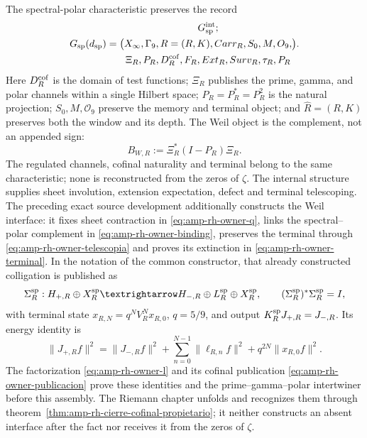 The spectral-polar characteristic preserves the record
\begin{equation}\label{eq:pdf2-g-sp-explicito}
 \mathfrak G_{\rm sp}(d_{\rm sp})=
 \bigl(
 \begin{gathered}
  \mathfrak G_{\rm sp}^{\rm int};\\
  \widehat X_\infty,\Gamma_9,\widehat R=(R,K),
  \operatorname{Carr}_R,S_0,M,\mathcal O_9,\\
  \Xi_R,P_R,\mathcal D_R^{\rm cof},
  \mathcal F_R,\operatorname{Ext}_R,\operatorname{Surv}_R,
  \tau_R,\mathcal P_R
 \end{gathered}
 \bigr).
\end{equation}
Here $\mathcal D_R^{\rm cof}$ is the domain of test functions; $\Xi_R$ publishes
the prime, gamma, and polar channels within a single Hilbert space; $P_R=P_R^*=P_R^2$ is the
natural projection; $S_0,M,\mathcal O_9$ preserve the memory and terminal object; and
$\widehat R=(R,K)$ preserves both the window and its depth. The Weil object
is the complement, not an appended sign:
\begin{equation}\label{eq:pdf2-g-sp-complemento}
 B_{W,R}:=\Xi_R^*(I-P_R)\Xi_R.
\end{equation}
The regulated channels, cofinal naturality and terminal belong to the same characteristic; none is reconstructed from the zeros of $\zeta$. The internal structure supplies sheet involution, extension expectation, defect and terminal telescoping. The preceding exact source development additionally constructs the Weil interface: it fixes sheet contraction in \eqref{eq:amp-rh-owner-q}, links the spectral--polar complement in \eqref{eq:amp-rh-owner-binding}, preserves the terminal through \eqref{eq:amp-rh-owner-telescopia} and proves its extinction in \eqref{eq:amp-rh-owner-terminal}. In the notation of the common constructor, that already constructed colligation is published as
\begin{equation}\label{eq:pdf2-g-sp-coligacion-dato}
 \Sigma_R^{\rm sp}:
 \mathcal H_{+,R}\oplus\mathcal X_R^{\rm sp}
 \longrightarrow
 \mathcal H_{-,R}\oplus\mathcal L_R^{\rm sp}
 \oplus\mathcal X_R^{\rm sp},
 \qquad
 (\Sigma_R^{\rm sp})^*\Sigma_R^{\rm sp}=I,
\end{equation}
with terminal state $x_{R,N}=q^NV_R^Nx_{R,0}$, $q=5/9$, and output
$K_R^{\rm sp}J_{+,R}=J_{-,R}$. Its energy identity is
\begin{equation}\label{eq:pdf2-g-sp-identidad-finita-dato}
 \|J_{+,R}f\|^2
 =\|J_{-,R}f\|^2+
   \sum_{n=0}^{N-1}\|\ell_{R,n}f\|^2+
   q^{2N}\|x_{R,0}f\|^2.
\end{equation}
The factorization \eqref{eq:amp-rh-owner-l} and its cofinal publication \eqref{eq:amp-rh-owner-publicacion} prove these identities and the prime--gamma--polar intertwiner before this assembly. The Riemann chapter unfolds and recognizes them through theorem~\ref{thm:amp-rh-cierre-cofinal-propietario}; it neither constructs an absent interface after the fact nor receives it from the zeros of $\zeta$.

